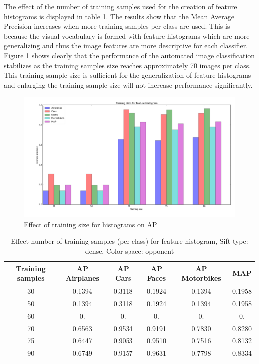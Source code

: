 The effect of the number of training samples used for the creation of feature histograms is displayed in table \ref{tab:size_hist}. The results show that the Mean Average Precision increases when more training samples per class are used. This is because the visual vocabulary is formed with feature histograms which are more generalizing and thus the image features are more descriptive for each classifier. Figure \ref{fig:size_hist} shows clearly that the performance of the automated image classification stabilizes as the training samples size reaches approximately 70 images per class. This training sample size is sufficient for the generalization of feature histograms and enlarging the training sample size will not increase performance significantly. 

\begin{figure}[H]
\includegraphics[width=\textwidth]{../plots/training_size_feature_histograms}
\caption{Effect of training size for histograms on AP}
\label{fig:size_hist}
\end{figure}

\begin{table}[H]
\begin{tabular}{|c|ccccc|}
\hline
\textbf{Training samples} & \textbf{AP Airplanes} & \textbf{AP Cars} & \textbf{AP Faces} & \textbf{AP Motorbikes} & \textbf{MAP}\\
\hline
30 & 0.1394 & 0.3118& 0.1924& 0.1394 & 0.1958\\
50 & 0.1394 & 0.3118& 0.1924& 0.1394 & 0.1958\\
60 & 0. & 0. & 0. & 0. & 0.\\
70 & 0.6563 & 0.9534 & 0.9191 & 0.7830 & 0.8280\\
75 & 0.6447 & 0.9053 & 0.9510 & 0.7516 & 0.8132\\
90 & 0.6749 & 0.9157 & 0.9631 & 0.7798 & 0.8334\\
\hline
\end{tabular}
\caption{Effect number of training samples (per class) for feature histogram, Sift type: dense, Color space: opponent}
\label{tab:size_hist}
\end{table}
